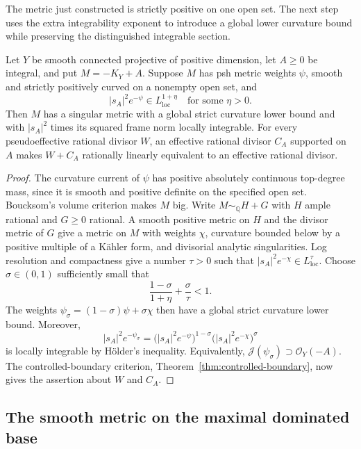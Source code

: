 The metric just constructed is strictly positive on one open set.
The next step uses the extra integrability exponent to introduce a
global lower curvature bound while preserving the distinguished
integrable section.

\begin{lemma}\label{coa:weighted-effectivity}
Let $Y$ be smooth connected projective of positive dimension, let
$A\geq0$ be integral, and put $M=-K_Y+A$.  Suppose $M$ has psh metric
weights $\psi$, smooth and strictly positively curved on a nonempty
open set, and
\[
 |s_A|^2e^{-\psi}\in L^{1+\eta}_{\mathrm{loc}}
 \quad\text{for some }\eta>0.
\]
Then $M$ has a singular metric with a global strict curvature lower
bound and with $|s_A|^2$ times its squared frame norm locally
integrable.  For every pseudoeffective rational divisor $W$, an
effective rational divisor $C_A$ supported on $A$ makes $W+C_A$
rationally linearly equivalent to an effective rational divisor.
\end{lemma}

\begin{proof}
The curvature current of $\psi$ has positive absolutely continuous
top-degree mass, since it is smooth and positive definite on the
specified open set.  Boucksom's volume criterion
\cite{Boucksom2002} makes $M$ big.  Write
$M\sim_{\mathbb Q}H+G$ with $H$ ample rational and $G\geq0$ rational.
A smooth positive metric on $H$ and the divisor metric of $G$ give a
metric on $M$ with weights $\chi$, curvature bounded below by a
positive multiple of a K\"ahler form, and divisorial analytic
singularities.  Log resolution and compactness give a number
$\tau>0$ such that $|s_A|^2e^{-\chi}\in L^\tau_{\mathrm{loc}}$.
Choose $\sigma\in(0,1)$ sufficiently small that
\[
 \frac{1-\sigma}{1+\eta}+\frac{\sigma}{\tau}<1.
\]
The weights $\psi_\sigma=(1-\sigma)\psi+\sigma\chi$ then have a
global strict curvature lower bound.  Moreover,
\[
 |s_A|^2e^{-\psi_\sigma}
 =\bigl(|s_A|^2e^{-\psi}\bigr)^{1-\sigma}
  \bigl(|s_A|^2e^{-\chi}\bigr)^\sigma
\]
is locally integrable by H\"older's inequality.  Equivalently,
$\mathcal J(\psi_\sigma)\supset\mathcal O_Y(-A)$.
The controlled-boundary criterion, Theorem~\ref{thm:controlled-boundary},
now gives the assertion about $W$ and $C_A$.
\end{proof}

\subsection{The smooth metric on the maximal dominated base}
\label{coa:maximal-base}\label{coa:dominated-conversion}

